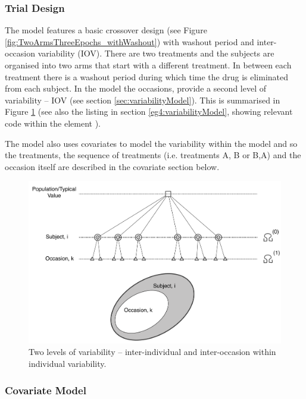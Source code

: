 \subsubsection{Trial Design}
The model features a basic crossover design (see Figure
\ref{fig:TwoArmsThreeEpochs_withWashout}) with washout period and inter-occasion
variability (IOV). There are two treatments and the subjects are
organised into two arms that start with a different treatment. In
between each treatment there is a washout period during which time the
drug is eliminated from each subject. 
In the model the occasions, provide a second level of variability -- 
IOV  (see section \ref{sec:variabilityModel}).  
This is summarised in Figure \ref{fig:eg4-IOV_2levels} (see also the listing 
in section \ref{eg4:variabilityModel}, showing relevant code 
within the element ).

The model also uses covariates to model the variability within the
model and so the treatments, the sequence of treatments (i.e.\xspace treatments A, B or
B,A) and the occasion itself are described in the covariate section
below.

\begin{figure}[ht!]
\centering
 \includegraphics[width=120mm]{pics/IOV_2levels}
\caption{Two levels of variability -- inter-individual and inter-occasion within individual variability.}
\label{fig:eg4-IOV_2levels}
\end{figure}


\subsubsection{Covariate Model}
\label{eg4:covariates-defn}


